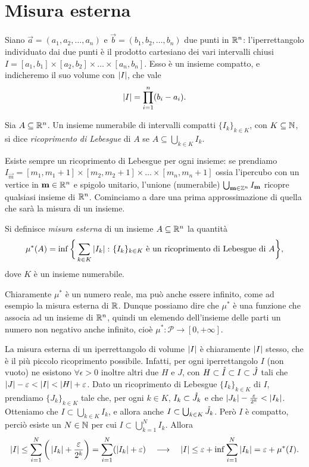 \section{Misura esterna}
\label{sec:misura-esterna}
Siano $\vec a=(a_1,a_2,\dots,a_n)$ e $\vec b=(b_1,b_2,\dots,b_n)$ due punti in $\mathbb{R}^n$: l'iperrettangolo individuato dai due punti è il prodotto cartesiano dei vari intervalli chiusi $I=[a_1,b_1]\times[a_2,b_2]\times\dots\times[a_n,b_n]$.
Esso è un insieme compatto, e indicheremo il suo volume con $\left|{I}\right|$, che vale
\begin{equation*}
	\left|{I}\right|=\prod_{i=1}^n(b_i-a_i).
\end{equation*}
\begin{definizione} \label{d:ricoprimento-lebesgue}
	Sia $A\subseteq\mathbb{R}^n$.
	Un insieme numerabile di intervalli compatti $\{I_k\}_{k\in K}$, con $K\subseteq\mathbb{N}$, si dice \emph{ricoprimento di Lebesgue} di $A$ se $A\subseteq\bigcup_{k\in K}I_k$.
\end{definizione}
Esiste sempre un ricoprimento di Lebesgue per ogni insieme: se prendiamo $I_{\vec m}=[m_1,m_1+1]\times[m_2,m_2+1]\times\dots\times[m_n,m_n+1]$ ossia l'ipercubo con un vertice in $\mathbf{m}\in\mathbb{R}^n$ e spigolo unitario, l'unione (numerabile) $\bigcup_{\mathbf{m}\in\mathbb{Z}^n}I_{\mathbf{m}}$ ricopre qualsiasi insieme di $\mathbb{R}^n$.
Cominciamo a dare una prima approssimazione di quella che sarà la misura di un insieme.
\begin{definizione} \label{d:misura-esterna}
	Si definisce \emph{misura esterna} di un insieme $A\subseteq\mathbb{R}^n$ la quantità
	\begin{equation*}
		\mu^*(A)=\inf\bigg\{\sum_{k\in K}\left|{I_k}\right|\colon\{I_k\}_{k\in K}\text{ è un ricoprimento di Lebesgue di }A\bigg\},
	\end{equation*}
	dove $K$ è un insieme numerabile.
\end{definizione}
Chiaramente $\mu^*$ è un numero reale, ma può anche essere infinito, come ad esempio la misura esterna di $\mathbb{R}$.
Dunque possiamo dire che $\mu^*$ è una funzione che associa ad un insieme di $\mathbb{R}^n$, quindi un elemendo dell'insieme delle parti un numero non negativo anche infinito, cioè $\mu^*\colon\mathcal P\to[0,+\infty]$.

La misura esterna di un iperrettangolo di volume $\left|{I}\right|$ è chiaramente $\left|{I}\right|$ stesso, che è il più piccolo ricoprimento possibile.
Infatti, per ogni iperrettangolo $I$ (non vuoto) ne esistono $\forall\epsilon>0$ inoltre altri due $H$ e $J$, con $H\subset\mathring{I}\subset I\subset\mathring{J}$ tali che $\left|{J}\right|-\varepsilon<\left|{I}\right|<\left|{H}\right|+\varepsilon$.
Dato un ricoprimento di Lebesgue $\{I_k\}_{k\in K}$ di $I$, prendiamo $\{J_k\}_{k\in K}$ tale che, per ogni $k\in K$, $I_k\subset\mathring{J_k}$ e che $\left|{J_k}\right|-\frac{\varepsilon}{2^k}<\left|{I_k}\right|$.
Otteniamo che $I\subset\bigcup_{k\in K} I_k$, e allora anche $I\subset\bigcup_{k\in K}\mathring{J_k}$.
Però $I$ è compatto, perciò esiste un $N\in\mathbb{N}$ per cui $I\subset\bigcup_{k=1}^NI_k$.
Allora
\begin{equation}
	\left|{I}\right|\leq\sum_{i=1}^N\bigg(\left|{I_k}\right|+\frac{\varepsilon}{2^k}\bigg)=\sum_{i=1}^N(\left|{I_k}\right|+\varepsilon)\quad\longrightarrow\quad\left|{I}\right|\leq\varepsilon+\inf\sum_{i=1}^N\left|{I_k}\right|=\varepsilon+\mu^*(I).
\end{equation}

